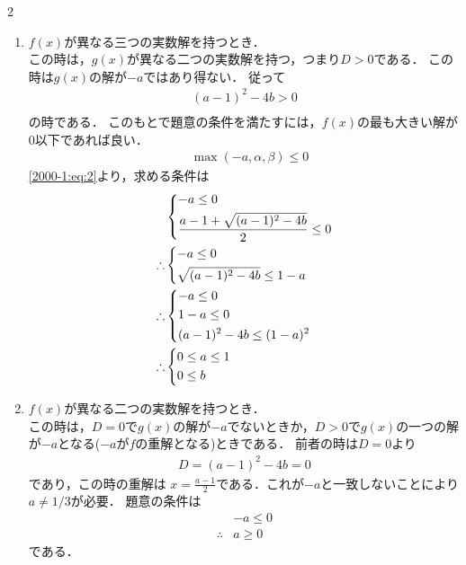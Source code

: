 \documentclass[../../main.tex]{subfiles}
\begin{document}
\begin{multicols}{2}
  \begin{enumerate}
    \item $f(x)$が異なる三つの実数解を持つとき．\\
          この時は，$g(x)$が異なる二つの実数解を持つ，つまり$D>0$である．
          この時は$g(x)$の解が$-a$ではあり得ない．
          従って
          \begin{align*}
            (a-1)^2-4b > 0 \\
          \end{align*}
          の時である．
          このもとで題意の条件を満たすには，$f(x)$の最も大きい解が$0$以下であれば良い．
          \begin{align*}
             & \max(-a, \alpha, \beta) \le 0
          \end{align*}
          \cref{2000-1:eq:2}より，求める条件は
          \begin{align*}
             & \begin{dcases}
                 -a \le 0 \\
                 \frac{a-1 + \sqrt{(a-1)^2-4b}}{2} \le 0
               \end{dcases} \\
            \therefore
             & \begin{dcases}
                 -a \le 0 \\
                 \sqrt{(a-1)^2-4b} \le 1-a
               \end{dcases}                    \\
            \therefore
             & \begin{dcases}
                 -a \le 0  \\
                 1-a \le 0 \\
                 (a-1)^2-4b \le (1-a)^2
               \end{dcases}                       \\
            \therefore
             & \begin{dcases}
                 0 \le a \le 1 \\
                 0 \le b
               \end{dcases}
          \end{align*}
    \item $f(x)$が異なる二つの実数解を持つとき．\\
          この時は，$D=0$で$g(x)$の解が$-a$でないときか，$D>0$で$g(x)$の一つの解が$-a$となる($-a$が$f$の重解となる)ときである．
          前者の時は$D=0$より
          \begin{align*}
            D = (a-1)^2 -4b = 0
          \end{align*}
          であり，この時の重解は $x = \frac{a-1}{2}$である．これが$-a$と一致しないことにより$a\neq 1/3$が必要．
          題意の条件は
          \begin{align*}
             & -a \le 0 \\
            \therefore
             & a \ge 0
          \end{align*}
          である．


\end{enumerate}
\end{multicols}
\end{document}
